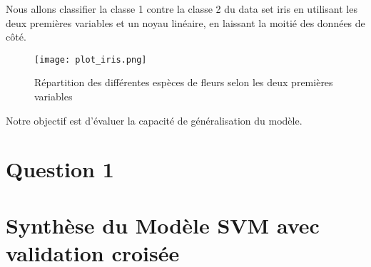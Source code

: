 \documentclass{article}
\begin{document}
Nous allons classifier la classe 1 contre la classe 2 du data set iris en utilisant les deux premières variables et un noyau linéaire, en laissant la moitié des données de côté. 




\begin{figure}[H]
    \centering
    \texttt{[image: plot\_iris.png]}
    \caption{Répartition des différentes espèces de fleurs selon les deux premières variables }
    \label{fig:enter-label}
\end{figure}

\pagebreak
Notre objectif est d'évaluer la capacité de généralisation du modèle.


\section{Question 1}




\section*{Synthèse du Modèle SVM avec validation croisée}
\end{document}
